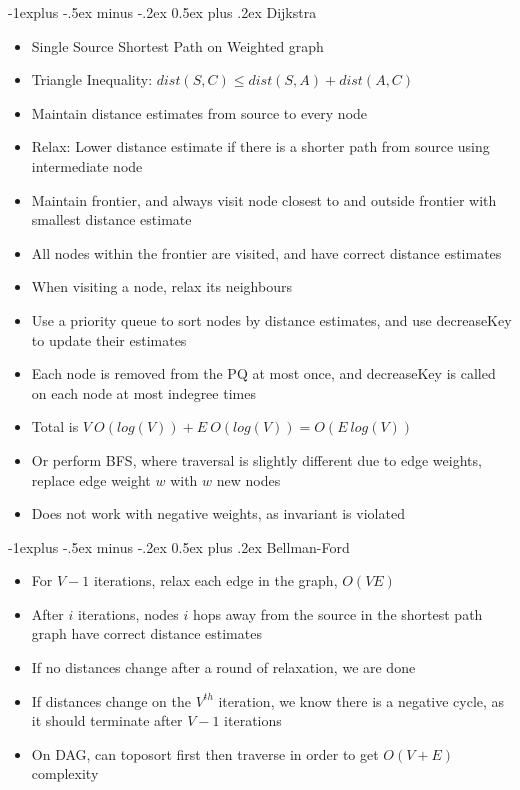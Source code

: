 \documentclass[10pt, landscape]{article}
\makeatletter
\renewcommand{\section}{\@startsection{section}{1}{0mm}%
                                {-1ex plus -.5ex minus -.2ex}%
                                {0.5ex plus .2ex}%
                                {\normalfont\large\bfseries}}
\renewcommand{\section}{\@startsection{section}{2}{0mm}%
                                {-1explus -.5ex minus -.2ex}%
                                {0.5ex plus .2ex}%
                                {\normalfont\normalsize\bfseries}}
\makeatother
\begin{document}
\begin{multicols*}{4}
\section{Dijkstra}
\begin{itemize}
    \item Single Source Shortest Path on Weighted graph
    \item Triangle Inequality: $dist(S, C) \leq dist(S, A)+dist(A, C)$
    \item Maintain distance estimates from source to every node
    \item Relax: Lower distance estimate if there is a shorter path from source using intermediate node
    \item Maintain frontier, and always visit node closest to and outside frontier with smallest distance estimate
    \item All nodes within the frontier are visited, and have correct distance estimates
    \item When visiting a node, relax its neighbours
    \item Use a priority queue to sort nodes by distance estimates, and use decreaseKey to update their estimates
    \item Each node is removed from the PQ at most once, and decreaseKey is called on each node at most indegree times
    \item Total is $V\ O(log(V)) + E \ O(log(V))=O(E\ log(V))$
    \item Or perform BFS, where traversal is slightly different due to edge weights, replace edge weight $w$ with $w$ new nodes
    \item Does not work with negative weights, as invariant is violated
\end{itemize}

\section{Bellman-Ford}
\begin{itemize}
    \item For $V-1$ iterations, relax each edge in the graph, $O(VE)$
    \item After $i$ iterations, nodes $i$ hops away from the source in the shortest path graph have correct distance estimates
    \item If no distances change after a round of relaxation, we are done
    \item If distances change on the $V^{th}$ iteration, we know there is a negative cycle, as it should terminate after $V-1$ iterations
    \item On DAG, can toposort first then traverse in order to get $O(V+E)$ complexity
\end{itemize}


\end{multicols*}
\end{document}
